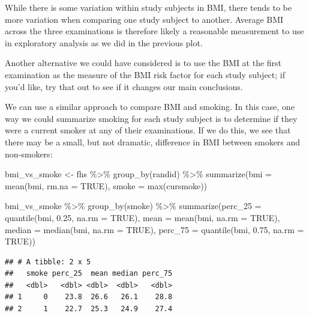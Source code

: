 \documentclass[
]{book}
\newenvironment{Shaded}{\begin{snugshade}}{\end{snugshade}}
\newcommand{\AttributeTok}[1]{\textcolor[rgb]{0.77,0.63,0.00}{#1}}
\newcommand{\ConstantTok}[1]{\textcolor[rgb]{0.00,0.00,0.00}{#1}}
\newcommand{\FloatTok}[1]{\textcolor[rgb]{0.00,0.00,0.81}{#1}}
\newcommand{\FunctionTok}[1]{\textcolor[rgb]{0.00,0.00,0.00}{#1}}
\newcommand{\NormalTok}[1]{#1}
\newcommand{\OtherTok}[1]{\textcolor[rgb]{0.56,0.35,0.01}{#1}}
\newcommand{\SpecialCharTok}[1]{\textcolor[rgb]{0.00,0.00,0.00}{#1}}
\begin{document}
While there is some variation within study subjects in BMI, there tends to be more variation when comparing one study subject to another. Average BMI across the three examinations is therefore likely a reasonable measurement to use in exploratory analysis as we did in the previous plot.

Another alternative we could have considered is to use the BMI at the first examination as the measure of the BMI risk factor for each study subject; if you'd like, try that out to see if it changes our main conclusions.

We can use a similar approach to compare BMI and smoking. In this case, one way we could summarize smoking for each study subject is to determine if they were a current smoker at any of their examinations. If we do this, we see that there may be a small, but not dramatic, difference in BMI between smokers and non-smokers:

\begin{Shaded}
\begin{Highlighting}[]
\NormalTok{bmi\_vs\_smoke }\OtherTok{\textless{}{-}}\NormalTok{ fhs }\SpecialCharTok{\%\textgreater{}\%} 
  \FunctionTok{group\_by}\NormalTok{(randid) }\SpecialCharTok{\%\textgreater{}\%} 
  \FunctionTok{summarize}\NormalTok{(}\AttributeTok{bmi =} \FunctionTok{mean}\NormalTok{(bmi, }\AttributeTok{rm.na =} \ConstantTok{TRUE}\NormalTok{), }
            \AttributeTok{smoke =} \FunctionTok{max}\NormalTok{(cursmoke))}

\NormalTok{bmi\_vs\_smoke }\SpecialCharTok{\%\textgreater{}\%} 
  \FunctionTok{group\_by}\NormalTok{(smoke) }\SpecialCharTok{\%\textgreater{}\%} 
  \FunctionTok{summarize}\NormalTok{(}\AttributeTok{perc\_25 =} \FunctionTok{quantile}\NormalTok{(bmi, }\FloatTok{0.25}\NormalTok{, }\AttributeTok{na.rm =} \ConstantTok{TRUE}\NormalTok{), }
            \AttributeTok{mean =} \FunctionTok{mean}\NormalTok{(bmi, }\AttributeTok{na.rm =} \ConstantTok{TRUE}\NormalTok{), }
            \AttributeTok{median =} \FunctionTok{median}\NormalTok{(bmi, }\AttributeTok{na.rm =} \ConstantTok{TRUE}\NormalTok{),}
            \AttributeTok{perc\_75 =} \FunctionTok{quantile}\NormalTok{(bmi, }\FloatTok{0.75}\NormalTok{, }\AttributeTok{na.rm =} \ConstantTok{TRUE}\NormalTok{)) }
\end{Highlighting}
\end{Shaded}

\begin{verbatim}
## # A tibble: 2 x 5
##   smoke perc_25  mean median perc_75
##   <dbl>   <dbl> <dbl>  <dbl>   <dbl>
## 1     0    23.8  26.6   26.1    28.8
## 2     1    22.7  25.3   24.9    27.4
\end{verbatim}
\end{document}
